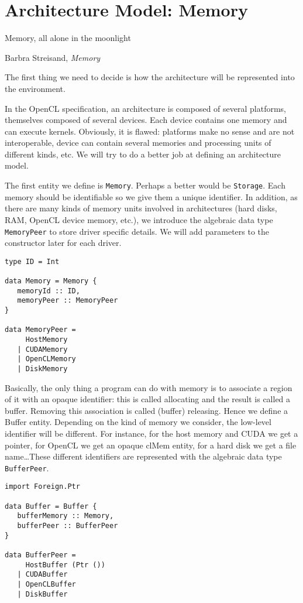 \chapter{Architecture Model: Memory}

\epigraph{Memory, all alone in the moonlight}{Barbra Streisand,
\textit{Memory}}

The first thing we need to decide is how the architecture will be represented
into the environment. 

In the OpenCL specification, an architecture is composed of several platforms,
themselves composed of several devices. Each device contains one memory and can
execute kernels. Obviously, it is flawed: platforms make no sense and are not
interoperable, device can contain several memories and processing units of
different kinds, etc. We will try to do a better job at defining an architecture
model.

The first entity we define is \texttt{Memory}. Perhaps a better would be
\texttt{Storage}. Each memory should be identifiable so we give them a unique
identifier. In addition, as there are many kinds of memory units
involved in architectures (hard disks, RAM, OpenCL device memory, etc.), we
introduce the algebraic data type \texttt{MemoryPeer} to store driver
specific details. We will add parameters to the constructor later for each
driver.

\begin{lstlisting}
type ID = Int

data Memory = Memory {
   memoryId :: ID,
   memoryPeer :: MemoryPeer
}

data MemoryPeer =
     HostMemory
   | CUDAMemory
   | OpenCLMemory
   | DiskMemory
\end{lstlisting}

Basically, the only thing a program can do with memory is to associate a region
of it with an opaque identifier: this is called allocating and the result is
called a buffer. Removing this association is called (buffer) releasing. Hence
we define a Buffer entity. Depending on the kind of memory we consider, the
low-level identifier will be different. For instance, for the host memory and
CUDA we get a pointer, for OpenCL we get an opaque clMem entity, for a hard disk
we get a file name\ldots These different identifiers are represented with the
algebraic data type \texttt{BufferPeer}.

\begin{lstlisting}
import Foreign.Ptr

data Buffer = Buffer {
   bufferMemory :: Memory,
   bufferPeer :: BufferPeer
}

data BufferPeer = 
     HostBuffer (Ptr ())
   | CUDABuffer
   | OpenCLBuffer
   | DiskBuffer
\end{lstlisting}

